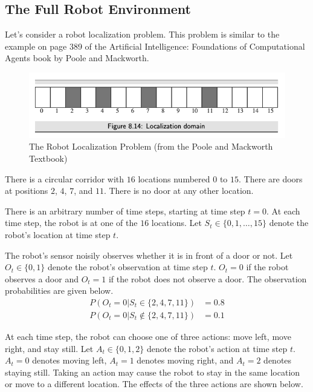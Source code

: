 \documentclass[12pt]{article}
\begin{document}
\subsection*{The Full Robot Environment}

Let's consider a robot localization problem. This problem is similar to the example on page 389 of the Artificial Intelligence: Foundations of Computational Agents book by Poole and Mackworth.

\begin{figure}[ht!]
    \centering
    \includegraphics[scale=0.6]{images_posted/robot_localization.png}
    \caption{The Robot Localization Problem (from the Poole and Mackworth Textbook)}
    \label{fig:robot_localization_corridor}
\end{figure}

There is a circular corridor with $16$ locations numbered $0$ to $15$. There are doors at positions $2$, $4$, $7$, and $11$. There is no door at any other location. 

There is an arbitrary number of time steps, starting at time step $t = 0$. At each time step, the robot is at one of the $16$ locations. Let $S_t \in \{0, 1, \dots, 15\}$ denote the robot's location at time step $t$.

The robot's sensor noisily observes whether it is in front of a door or not. Let $O_t \in \{0, 1\}$ denote the robot's observation at time step $t$. $O_t = 0$ if the robot observes a door and $O_t = 1$ if the robot does not observe a door. The observation probabilities are given below.
%
\begin{align}
P(O_t = 0 | S_t \in \{2, 4, 7, 11\} ) & = 0.8 \\
P(O_t = 0 | S_t \not\in \{2, 4, 7, 11\} ) & = 0.1 
\end{align}

At each time step, the robot can choose one of three actions: move left, move right, and stay still. Let $A_t \in \{0, 1, 2\}$ denote the robot's action at time step $t$. $A_t = 0$ denotes moving left, $A_t = 1$ denotes moving right, and $A_t = 2$ denotes staying still. Taking an action may cause the robot to stay in the same location or move to a different location. The effects of the three actions are shown below.
\end{document}
